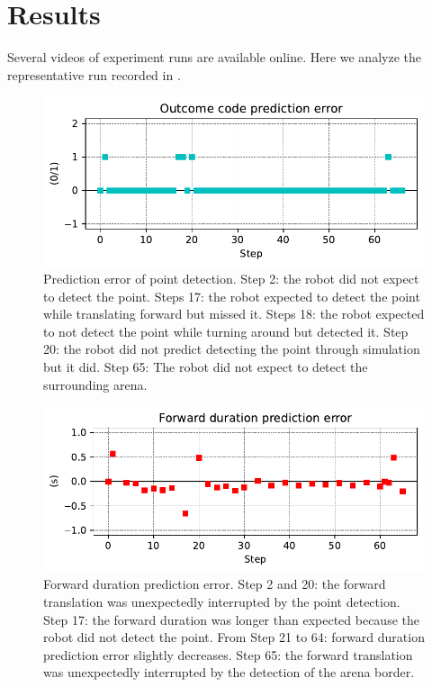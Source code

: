 \documentclass[runningheads]{llncs}
\begin{document}
\section{Results}

Several videos of experiment runs are available online. 
Here we analyze the representative run recorded in \cite{georgeon_petitcat_2024}.

\begin{figure}
	\includegraphics[width=\textwidth]{01_Outcome_code.pdf}
	\caption{Prediction error of point detection.
	Step 2: the robot did not expect to detect the point.
	Steps 17: the robot expected to detect the point while translating forward but missed it.
	Steps 18: the robot expected to not detect the point while turning around but detected it.
	Step 20: the robot did not predict detecting the point through simulation but it did. 
	Step 65: The robot did not expect to detect the surrounding arena. } \label{fig:yaw_pe}
\end{figure}

\begin{figure}
	\includegraphics[width=\textwidth]{07_Forward_duration_pe.pdf}
	\caption{Forward duration prediction error.
	Step 2 and 20: the forward translation was unexpectedly interrupted by the point detection.
	Step 17: the forward duration was longer than expected because the robot did not detect the point.
	From Step 21 to 64: forward duration prediction error slightly decreases. 
	Step 65: the forward translation was unexpectedly interrupted by the detection of the arena border.} \label{fig:yaw_re}
\end{figure}
\end{document}
